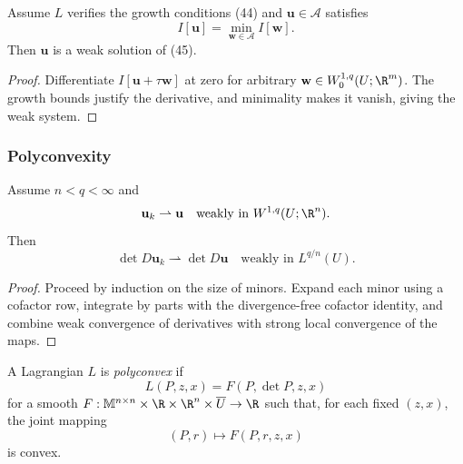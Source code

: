\begin{theorem}
\label{thm:weak-solution-euler-lagrange-system}
Assume $L$ verifies the growth conditions (44) and $\mathbf{u} \in \mathcal{A}$ satisfies
\[
I[\mathbf{u}] = \min_{\mathbf{w} \in \mathcal{A}} I[\mathbf{w}].
\]
Then $\mathbf{u}$ is a weak solution of (45).
\end{theorem}

\begin{proof}
\sketch Differentiate $I[\mathbf u+\tau\mathbf w]$ at zero for arbitrary $\mathbf w\in W_0^{1,q}(U;\R^m)$. The growth bounds justify the derivative, and minimality makes it vanish, giving the weak system.
\end{proof}

\subsubsection{Polyconvexity}

\begin{lemma}
\label{lem:weak-continuity-of-determinants}
Assume $n < q < \infty$ and
\[
\mathbf{u}_k \rightharpoonup \mathbf{u} \quad \text{weakly in } W^{1,q}(U; \R^n).
\]
Then
\[
\det D\mathbf{u}_k \rightharpoonup \det D\mathbf{u} \quad \text{weakly in } L^{q/n}(U).
\]
\end{lemma}

\begin{proof}
\sketch Proceed by induction on the size of minors. Expand each minor using a cofactor row, integrate by parts with the divergence-free cofactor identity, and combine weak convergence of derivatives with strong local convergence of the maps.
\end{proof}

\begin{definition}
\label{def:polyconvex-lagrangian}
A Lagrangian $L$ is \textit{polyconvex} if
\[
L(P,z,x)=F(P,\det P,z,x)
\tag{51}
\]
for a smooth $F:\mathbb M^{n\times n}\times\R\times\R^n\times\overline U\to\R$ such that, for each fixed $(z,x)$, the joint mapping
\[
(P,r)\longmapsto F(P,r,z,x)
\tag{52}
\]
is convex.
\end{definition}

